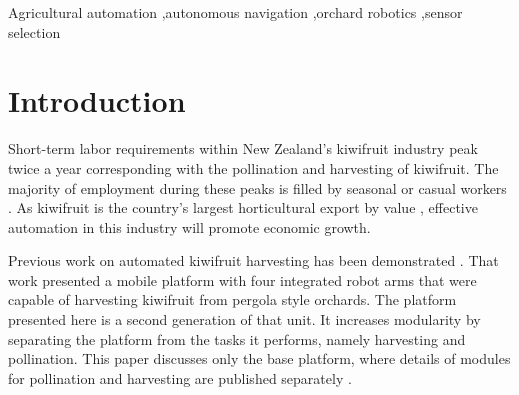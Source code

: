 \documentclass[preprint,authoryear,12pt]{elsarticle}
\begin{document}
\begin{frontmatter}
\begin{abstract}
    The selection of sensors best suited for autonomous navigation in this environment is discussed and presented with in-orchard test results.
    Details of the platform's software and hardware architecture are also discussed.
    The series-hybrid platform presented here has reliably self-navigated through two test orchards unassisted and is capable of carrying a \SI{1000}{\kilo\gram} payload.
\end{abstract}

\begin{keyword}

    Agricultural automation \sep autonomous navigation \sep orchard robotics \sep sensor selection
\end{keyword}

\end{frontmatter}

\linenumbers

\section{Introduction}
\label{sect:intro}
    Short-term labor requirements within New Zealand's kiwifruit industry peak twice a year corresponding with the pollination and harvesting of kiwifruit.
    The majority of employment during these peaks is filled by seasonal or casual workers \citep{Timmins2009}.
    As kiwifruit is the country's largest horticultural export by value \citep{StatisticsNewZealand2015}, effective automation in this industry will promote economic growth.

    Previous work on automated kiwifruit harvesting has been demonstrated \citep{Scarfe2012}.
    That work presented a mobile platform with four integrated robot arms that were capable of harvesting kiwifruit from pergola style orchards.
    The platform presented here is a second generation of that unit.
    It increases modularity by separating the platform from the tasks it performs, namely harvesting and pollination.
    This paper discusses only the base platform, where details of modules for pollination and harvesting are published separately \citep{williams2017,Seabright2017}.
\end{document}
